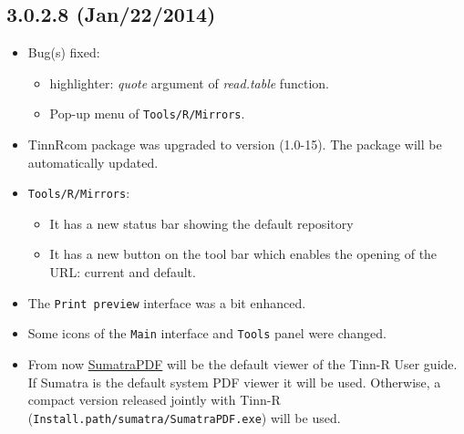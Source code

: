 \subsection*{3.0.2.8 (Jan/22/2014)}
\begin{itemize}
  \item Bug(s) fixed:
    \begin{itemize}
      \item \RR{} highlighter: \textit{quote} argument of \textit{read.table} function.
      \item Pop-up menu of \texttt{Tools/R/Mirrors}.
    \end{itemize}
  \item TinnRcom package was upgraded to version (1.0-15).
   The package will be automatically updated.
  \item \texttt{Tools/R/Mirrors}:
    \begin{itemize}
       \item It has a new status bar showing the default repository
       \item It has a new button on the tool bar which enables the opening of the
             URL: current and default.
    \end{itemize}
  \item The \texttt{Print preview} interface was a bit enhanced.
  \item Some icons of the \texttt{Main} interface and \texttt{Tools} panel were changed.
  \item From now \href{http://blog.kowalczyk.info/software/sumatrapdf/free-pdf-reader.html}{SumatraPDF}
   will be the default viewer of the Tinn-R User guide.
   If Sumatra is the default system PDF viewer it will be used. Otherwise, a compact version
   released jointly with Tinn-R (\texttt{Install.path/sumatra/SumatraPDF.exe}) will be used.
\end{itemize}
